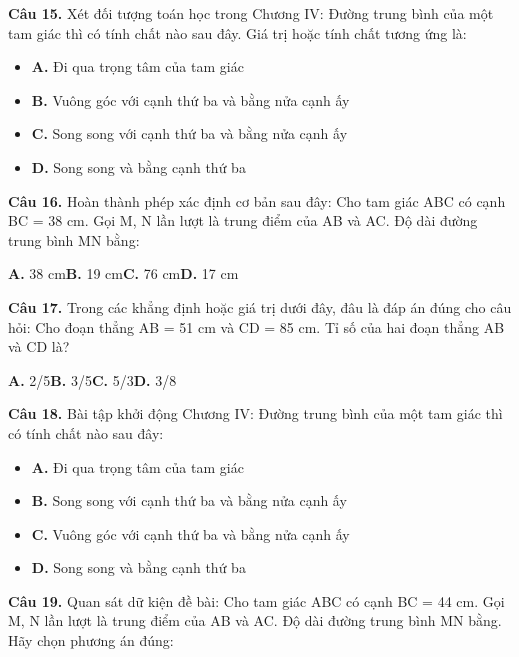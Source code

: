\documentclass[11pt,a4paper]{article}
\begin{document}
\textbf{\color{primary} Câu 15.} Xét đối tượng toán học trong Chương IV: Đường trung bình của một tam giác thì có tính chất nào sau đây. Giá trị hoặc tính chất tương ứng là:\par
\begin{itemize}\setlength{\itemsep}{1pt}\setlength{\parskip}{0pt}
  \item[] \textbf{A.} Đi qua trọng tâm của tam giác
  \item[] \textbf{B.} Vuông góc với cạnh thứ ba và bằng nửa cạnh ấy
  \item[] \textbf{C.} Song song với cạnh thứ ba và bằng nửa cạnh ấy
  \item[] \textbf{D.} Song song và bằng cạnh thứ ba
\end{itemize}\vspace{2pt}
\textbf{\color{primary} Câu 16.} Hoàn thành phép xác định cơ bản sau đây: Cho tam giác ABC có cạnh BC = 38 cm. Gọi M, N lần lượt là trung điểm của AB và AC. Độ dài đường trung bình MN bằng:\par
\hspace*{1.5em}\textbf{A.} 38 cm\quad\quad \textbf{B.} 19 cm\quad\quad \textbf{C.} 76 cm\quad\quad \textbf{D.} 17 cm\par\vspace{2pt}
\textbf{\color{primary} Câu 17.} Trong các khẳng định hoặc giá trị dưới đây, đâu là đáp án đúng cho câu hỏi: Cho đoạn thẳng AB = 51 cm và CD = 85 cm. Tỉ số của hai đoạn thẳng AB và CD là?\par
\hspace*{1.5em}\textbf{A.} 2/5\quad\quad \textbf{B.} 3/5\quad\quad \textbf{C.} 5/3\quad\quad \textbf{D.} 3/8\par\vspace{2pt}
\textbf{\color{primary} Câu 18.} Bài tập khởi động Chương IV: Đường trung bình của một tam giác thì có tính chất nào sau đây:\par
\begin{itemize}\setlength{\itemsep}{1pt}\setlength{\parskip}{0pt}
  \item[] \textbf{A.} Đi qua trọng tâm của tam giác
  \item[] \textbf{B.} Song song với cạnh thứ ba và bằng nửa cạnh ấy
  \item[] \textbf{C.} Vuông góc với cạnh thứ ba và bằng nửa cạnh ấy
  \item[] \textbf{D.} Song song và bằng cạnh thứ ba
\end{itemize}\vspace{2pt}
\textbf{\color{primary} Câu 19.} Quan sát dữ kiện đề bài: Cho tam giác ABC có cạnh BC = 44 cm. Gọi M, N lần lượt là trung điểm của AB và AC. Độ dài đường trung bình MN bằng. Hãy chọn phương án đúng:\par
\end{document}
